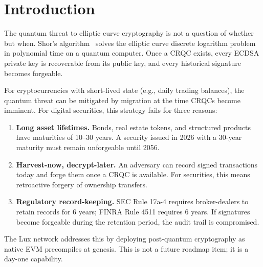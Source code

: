 \section{Introduction}

\label{sec:intro}

The quantum threat to elliptic curve cryptography is not a question of
whether but when.  Shor's algorithm~\cite{shor1994} solves the elliptic
curve discrete logarithm problem in polynomial time on a quantum
computer.  Once a CRQC exists, every ECDSA private key is recoverable
from its public key, and every historical signature becomes forgeable.

For cryptocurrencies with short-lived state (e.g., daily trading
balances), the quantum threat can be mitigated by migration at the
time CRQCs become imminent.  For digital securities, this strategy
fails for three reasons:

\begin{enumerate}[nosep]
  \item \textbf{Long asset lifetimes.}  Bonds, real estate tokens, and
        structured products have maturities of 10--30 years.  A security
        issued in 2026 with a 30-year maturity must remain unforgeable
        until 2056.
  \item \textbf{Harvest-now, decrypt-later.}  An adversary can record
        signed transactions today and forge them once a CRQC is
        available.  For securities, this means retroactive forgery of
        ownership transfers.
  \item \textbf{Regulatory record-keeping.}  SEC Rule 17a-4 requires
        broker-dealers to retain records for 6 years; FINRA Rule 4511
        requires 6 years.  If signatures become forgeable during the
        retention period, the audit trail is compromised.
\end{enumerate}

The Lux network addresses this by deploying post-quantum cryptography
as native EVM precompiles at genesis.  This is not a future roadmap
item; it is a day-one capability.

